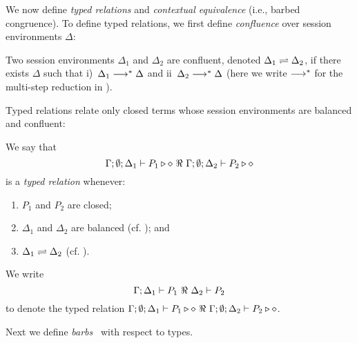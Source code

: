 \noi We now define \emph{typed relations} and \emph{contextual equivalence} (i.e., barbed congruence).  
To define typed relations, we first define \emph{confluence}
over session environments $\Delta$:
%
\begin{definition}\label{d:conf}
	Two session environments $\Delta_1$ and $\Delta_2$
	are confluent, denoted $\Delta_1 \rightleftharpoons \Delta_2$,
	if there exists $\Delta$ such that
	i)~$\Delta_1 \longrightarrow^\ast \Delta$ and ii~$\Delta_2 \longrightarrow^\ast \Delta$
	(here we write $\longrightarrow^\ast$ for the multi-step reduction in ).
\end{definition}
Typed relations relate only closed terms whose
session environments are balanced  and confluent:

\begin{definition}
	We say that
	\[
		\Gamma; \emptyset; \Delta_1 \vdash P_1 \triangleright \diamond\ \Re \ \Gamma; \emptyset; \Delta_2 \vdash P_2 \triangleright \diamond
	\]
%
	\noi
	is a {\em typed relation} whenever:
	\begin{enumerate}
		\item	$P_1$ and $P_2$ are closed;
		\item	$\Delta_1$ and $\Delta_2$ are balanced (cf. ); and
		\item	$\Delta_1 \rightleftharpoons \Delta_2$ (cf. ).
	\end{enumerate}
	\end{definition}
\begin{notation}
	We write
	\[
		\horel{\Gamma}{\Delta_1}{P_1}{\ \Re \ }{\Delta_2}{P_2}
	\]
	to denote the typed relation 
		$\Gamma; \emptyset; \Delta_1 \vdash P_1 \triangleright \diamond\ \Re \ \Gamma; \emptyset; \Delta_2 \vdash P_2 \triangleright \diamond$.
\end{notation}	


Next we define  {\em barbs}~\cite{MiSa92}
with respect to types. 

